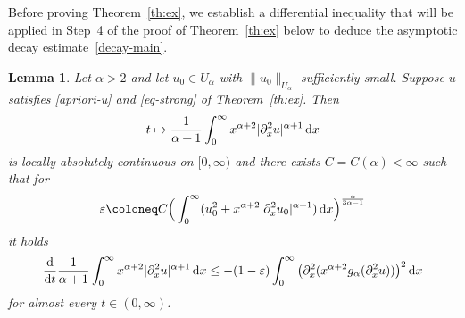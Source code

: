 \documentclass[reqno,12pt]{amsart}
\renewcommand{\d}{\ensuremath{\mathrm{d}}}
\newcommand{\eps}{\ensuremath{\varepsilon}}
\renewcommand{\d}{\ensuremath{{\rm d}}}
\newtheorem{lemma}[theorem]{Lemma}
\numberwithin{equation}{section}
\begin{document}
Before proving Theorem~\ref{th:ex}, we
establish a differential inequality that
will be applied in Step~4 of the proof of
Theorem~\ref{th:ex} below to deduce the
asymptotic decay estimate~\eqref{decay-main}.
%
\begin{lemma}\label{lem-der-uxx-int}
Let $\alpha > 2$ and let $u_0 \in U_\alpha$ with $\|u_0\|_{U_\alpha}$ sufficiently small. Suppose $u$ satisfies \eqref{apriori-u} and \eqref{eq-strong} of Theorem~\ref{th:ex}. Then 
\[
t \mapsto \frac{1}{\alpha+1}
\int_0^\infty x^{\alpha+2}
|\partial_x^2 u|^{\alpha+1}\,\d x
\]
is locally absolutely continuous on $[0,\infty)$ and there exists $C = C(\alpha) < \infty$ such that for
%
\[
\eps \coloneq C \Big(\int_0^\infty(u_0^2 + x^{\alpha+2}
|\partial_x^2 u_0|^{\alpha+1})\,\d x\Big)^{\frac{\alpha}{3\alpha-1}}
\]
%
it holds
%
\begin{equation}\label{eq-der-uxx-int}
\frac{\d}{\d t} \frac{1}{\alpha+1} \int_0^\infty x^{\alpha+2} |\partial_x^2 u|^{\alpha+1} \, \d x \le - (1-\eps) \int_0^\infty \big(\partial_x^2 (x^{\alpha+2} g_\alpha(\partial_x^2 u))\big)^2 \, \d x
\end{equation}
%
for almost every $t \in (0,\infty)$.
\end{lemma}
%
\end{document}
